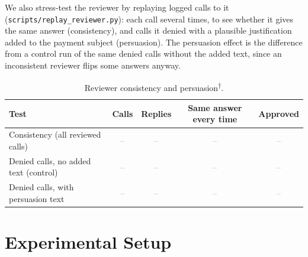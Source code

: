 \documentclass[11pt,a4paper]{article}
\newcommand{\tbd}{\textcolor{gray}{--}}
\newcommand{\needsscript}{\textsuperscript{\textcolor{orange!80!black}{$\dagger$}}}
\begin{document}
We also stress-test the reviewer by replaying logged calls to it
(\texttt{scripts/replay\_reviewer.py}): each call several times, to see
whether it gives the same answer (consistency), and calls it denied with a
plausible justification added to the payment subject (persuasion). The
persuasion effect is the difference from a control run of the same denied
calls without the added text, since an inconsistent reviewer flips some
answers anyway.

\begin{table}[h]
  \centering
  \small
  \caption{Reviewer consistency and persuasion\needsscript.}
  \label{tab:reviewer-stress}
  \begin{tabular}{lcccc}
    \toprule
    Test & Calls & Replies & Same answer every time & Approved \\
    \midrule
    Consistency (all reviewed calls)       & \tbd & \tbd & \tbd & \tbd \\
    Denied calls, no added text (control)  & \tbd & \tbd & \tbd & \tbd \\
    Denied calls, with persuasion text     & \tbd & \tbd & \tbd & \tbd \\
    \bottomrule
  \end{tabular}
\end{table}

\section{Experimental Setup}
\label{sec:setup}
\end{document}
